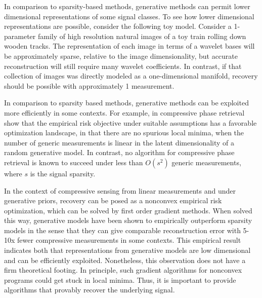 In comparison to sparsity-based methods, generative methods can permit lower dimensional representations of some signal classes.  To see how lower dimensional representations are possible, consider the following toy model.  Consider a 1-parameter family  of high resolution natural images of a toy train rolling down wooden tracks.  The representation of each image in terms of a wavelet bases will be approximately sparse, relative to the image dimensionality, but accurate reconstruction will still require many wavelet coefficients.  In contrast, if that collection of images was directly modeled as a one-dimensional manifold, recovery should be possible with approximately 1 measurement.

In comparison to sparsity based methods, generative methods can be exploited more efficiently in some contexts.  For example, in compressive phase retrieval \cite{hand2018phase} show that the empirical risk objective under suitable assumptions has a favorable optimization landscape, in that there are no spurious local minima, when the number of generic measurements is linear in the latent dimensionality of a random generative model.  In contrast, no algorithm for compressive phase retrieval is known to succeed under less than $O(s^2)$ generic measurements, where $s$ is the signal sparsity.


In the context of compressive sensing from linear measurements and under generative priors, recovery can be posed as a nonconvex empirical risk optimization, which can be solved by first order gradient methods.  When solved this way, generative models have been shown to empirically outperform sparsity models in the sense that they can give comparable reconstruction error with 5-10x fewer compressive measurements in some contexts.  This empirical result indicates both that representations from generative models are low dimensional and can be efficiently exploited.  Nonetheless, this observation does not have a firm theoretical footing.  In principle, such gradient algorithms for nonconvex programs could get stuck in local minima.  Thus, it is important to provide algorithms that provably recover the underlying signal.


